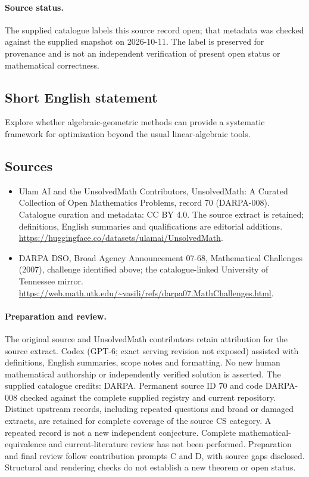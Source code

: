 \documentclass[11pt]{article}
\begin{document}
\paragraph{Source status.}
The supplied catalogue labels this source record open; that metadata was checked against the supplied snapshot on 2026-10-11. The label is preserved for provenance and is not an independent verification of present open status or mathematical correctness.
\subsection{Short English statement}
Explore whether algebraic-geometric methods can provide a systematic framework for optimization beyond the usual linear-algebraic tools.
\subsection{Sources}
\begin{itemize}
\item[\hypertarget{source:70:1}{S1}] Ulam AI and the UnsolvedMath Contributors, UnsolvedMath: A Curated Collection of Open Mathematics Problems, record 70 (DARPA-008). Catalogue curation and metadata: CC BY 4.0. The source extract is retained; definitions, English summaries and qualifications are editorial additions.
\url{https://huggingface.co/datasets/ulamai/UnsolvedMath}.
\item[\hypertarget{source:70:2}{S2}] DARPA DSO, Broad Agency Announcement 07-68, Mathematical Challenges (2007), challenge identified above; the catalogue-linked University of Tennessee mirror.
\url{https://web.math.utk.edu/~vasili/refs/darpa07.MathChallenges.html}.
\end{itemize}
\paragraph{Preparation and review.}
The original source and UnsolvedMath contributors retain attribution for the source extract. Codex (GPT-6; exact serving revision not exposed) assisted with definitions, English summaries, scope notes and formatting. No new human mathematical authorship or independently verified solution is asserted. The supplied catalogue credits: DARPA. Permanent source ID 70 and code DARPA-008 checked against the complete supplied registry and current repository. Distinct upstream records, including repeated questions and broad or damaged extracts, are retained for complete coverage of the source CS category. A repeated record is not a new independent conjecture. Complete mathematical-equivalence and current-literature review has not been performed. Preparation and final review follow contribution prompts C and D, with source gaps disclosed. Structural and rendering checks do not establish a new theorem or open status.
\label{end:70}
\end{document}
